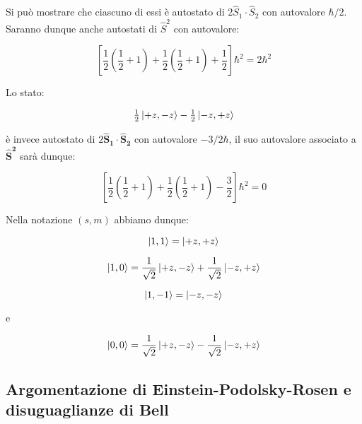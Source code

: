Si pu\`o mostrare che ciascuno di essi \`e autostato di $2 \hat{S}_1 \cdot \hat{S}_2$ con autovalore $\hbar / 2$. Saranno dunque anche autostati di $\hat{S}^2$ con autovalore:

	\begin{equation}
		\left [	\frac{1}{2} \left ( \frac{1}{2} + 1 \right ) + \frac{1}{2} \left ( \frac{1}{2} + 1 \right ) + \frac{1}{2} \right ] \hbar^2 = 2 \hbar^2
	\end{equation}

Lo stato:

	\begin{equation}
		\begin{array}{c}
			\frac{1}{2} \ket{+z, -z} - \frac{1}{2} \ket{-z, +z}
		\end{array}
	\end{equation}

\`e invece autostato di $2 \mathbf{\hat{S}_1} \cdot \mathbf{\hat{S}_2}$ con autovalore $-3/2 \hbar$, il suo autovalore associato a $\mathbf{\hat{S}^2}$ sar\`a dunque:

	\begin{equation}
		\left [	\frac{1}{2} \left ( \frac{1}{2} + 1 \right ) + \frac{1}{2} \left ( \frac{1}{2} + 1 \right ) - \frac{3}{2} \right ] \hbar^2 = 0
	\end{equation}

Nella notazione $(s, m)$ abbiamo dunque:

	\begin{equation}
		\ket{1, 1} = \ket{+z, +z}
	\end{equation}

	\begin{equation}
		\ket{1, 0} = \frac{1}{\sqrt{2}} \ket{+z, -z} + \frac{1}{\sqrt{2}} \ket{-z, +z}
	\end{equation}

	\begin{equation}
		\ket{1, -1} = \ket{-z, -z}
	\end{equation}

e

	\begin{equation}
		\ket{0, 0} = \frac{1}{\sqrt{2}} \ket{+z, -z} - \frac{1}{\sqrt{2}} \ket{-z, +z}
	\end{equation}

\subsection{Argomentazione di Einstein-Podolsky-Rosen e disuguaglianze di Bell}

